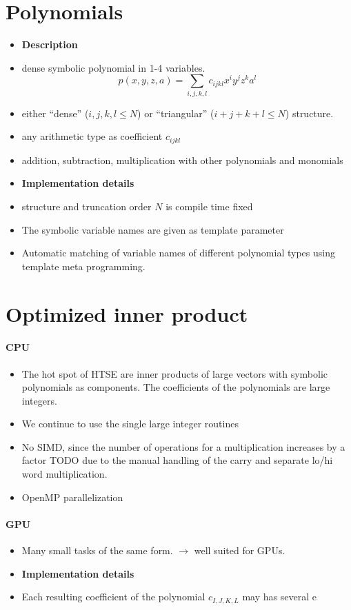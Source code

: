 \documentclass[oribibl]{llncs2e/llncs}
\begin{document}
\section{Polynomials}
\begin{itemize}
\item {\bf Description}
\item dense symbolic polynomial in 1-4 variables.
\begin{equation}
    p(x,y,z,a) = \sum_{i,j,k,l} c_{ijkl} x^i y^j z^k a^l
\end{equation}
\item either ``dense'' (${i,j,k,l} \le N$) or ``triangular'' ($i+j+k+l \le N$) structure.
\item any arithmetic type as coefficient $c_{ijkl}$
\item addition, subtraction, multiplication with other polynomials and monomials
\item {\bf Implementation details}
\item structure and truncation order $N$ is compile time fixed 
\item The symbolic variable names are given as template parameter
\item Automatic matching of variable names of different polynomial types using template meta programming.
\end{itemize}

\section{Optimized inner product}
\paragraph{CPU}
\begin{itemize}
\item The hot spot of HTSE are inner products of large vectors with symbolic polynomials as components. The coefficients of the polynomials are large integers.
\item We continue to use the single large integer routines
\item No SIMD, since the number of operations for a multiplication increases by a factor TODO due to the manual handling of the carry and separate lo/hi word multiplication.
\item OpenMP parallelization
\end{itemize}
\paragraph{GPU}
\begin{itemize}
\item Many small tasks of the same form. $\rightarrow$ well suited for GPUs.
\item {\bf Implementation details}
\item Each resulting coefficient of the polynomial $c_{I,J,K,L}$ may has several e
\end{itemize}
\end{document}
